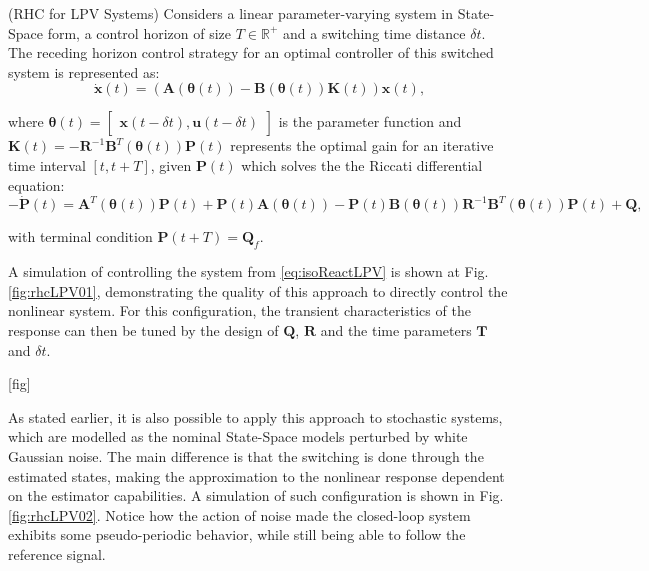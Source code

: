 \documentclass[a4paper,11pt]{book}
\numberwithin{figure}{chapter}
\numberwithin{equation}{chapter}
\numberwithin{table}{chapter}
\theoremstyle{definition}
\newtheorem{definition}{Definition}[chapter]
\newcounter{boxed-theorem}
\newcounter{boxed-definition}
\newenvironment{boxed-definition}[1]
{\begin{shaded} \begin{definition}{#1}}
{\end{definition} \end{shaded}}
\begin{document}
\begin{boxed-definition}{(RHC for LPV Systems)} \label{def:recedingHorizon}
	Considers a linear parameter-varying system in State-Space form, a control horizon of size $T \in \mathbb{R}^+$ and a switching time distance $\delta t$. The receding horizon control strategy for an optimal controller of this switched system is represented as:
	\begin{equation}
        \dot{\bm{x}}(t) = \left( \bm{A}(\bm{\theta}(t)) - \bm{B}(\bm{\theta}(t)) \bm{K}(t) \right) \bm{x}(t)
    ,\end{equation} 
    
	\noindent where $\bm{\theta}(t) = \begin{bmatrix} \bm{x}(t - \delta t), \bm{u}(t - \delta t) \end{bmatrix}$ is the parameter function and $\bm{K}(t) = - \bm{R}^{-1} \bm{B}^T(\bm{\theta}(t)) \bm{P}(t)$ represents the optimal gain for an iterative time interval $[t, t+T]$, given $\bm{P}(t)$ which solves the the Riccati differential equation:
    \begin{equation}
        -\dot{\bm{P}}(t) = \bm{A}^T(\bm{\theta}(t)) \bm{P}(t) + \bm{P}(t) \bm{A}(\bm{\theta}(t)) - \bm{P}(t) \bm{B}(\bm{\theta}(t)) \bm{R}^{-1} \bm{B}^T(\bm{\theta}(t)) \bm{P}(t) + \bm{Q}
    ,\end{equation}
    
    \noindent with terminal condition $\bm{P}(t+T) = \bm{Q}_f$.
\end{boxed-definition}

A simulation of controlling the system from \eqref{eq:isoReactLPV} is shown at Fig. \ref{fig:rhcLPV01}, demonstrating the quality of this approach to directly control the nonlinear system. For this configuration, the transient characteristics of the response can then be tuned by the design of $\bm{Q}$, $\bm{R}$ and the time parameters $\bm{T}$ and $\delta t$. 

[fig]

As stated earlier, it is also possible to apply this approach to stochastic systems, which are modelled as the nominal State-Space models perturbed by white Gaussian noise. The main difference is that the switching is done through the estimated states, making the approximation to the nonlinear response dependent on the estimator capabilities. A simulation of such configuration is shown in Fig. \ref{fig:rhcLPV02}. Notice how the action of noise made the closed-loop system exhibits some pseudo-periodic behavior, while still being able to follow the reference signal.
\end{document}
